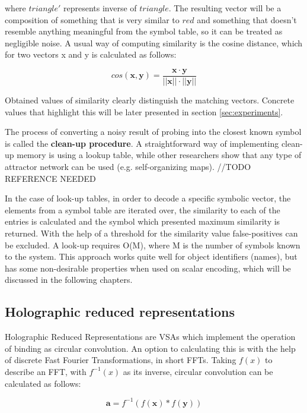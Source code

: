 \documentclass[conference]{IEEEtran}
\begin{document}
	where $triangle'$ represents inverse of $triangle$.
The resulting vector will be a composition of something that is very similar to $red$ and something that doesn't resemble anything meaningful from the symbol table, so it can be treated as negligible noise.	A usual way of computing similarity is the cosine distance, which for two vectors \pmb x and \pmb y is calculated as follows:
	
	\begin{equation}
cos(\pmb x, \pmb y) = \frac {\pmb x \cdot \pmb y}{||\pmb x|| \cdot ||\pmb y||}
	\end{equation} 
	
	Obtained values of similarity clearly distinguish the matching vectors. Concrete values that highlight this will be later presented in section \ref{sec:experiments}.	
	
	The process of converting a noisy result of probing into the closest known symbol is called the \textbf{clean-up procedure}.
A straightforward way of implementing clean-up memory is using a lookup table, while other researchers show that any type of attractor network can be used (e.g. self-organizing maps). //TODO REFERENCE NEEDED

	In the case of look-up tables, in order to decode a specific symbolic vector, the elements from a symbol table are iterated over, the similarity to each of the entries is calculated and the symbol which presented maximum similarity is returned. With the help of a threshold for the similarity value false-positives can be excluded. A look-up requires O(M), where M is the number of symbols known to the system. This approach works quite well for object identifiers (names), but has some non-desirable properties when used on scalar encoding, which will be discussed in the following chapters. 
	
	\subsection{Holographic reduced representations}
	\label{sec:hrr}
	
	Holographic Reduced Representations are VSAs which implement the operation of binding as circular convolution. An option to calculating this is with the help of discrete Fast Fourier Transformations, in short FFTs. Taking $f(x)$ to describe an FFT, with $f^{-1}(x)$ as its inverse, circular convolution can be calculated as follows:
	
	\begin{equation}
	\pmb a = f^{-1}(f(\pmb x) * f(\pmb y))
	\end{equation}
	
\end{document}
